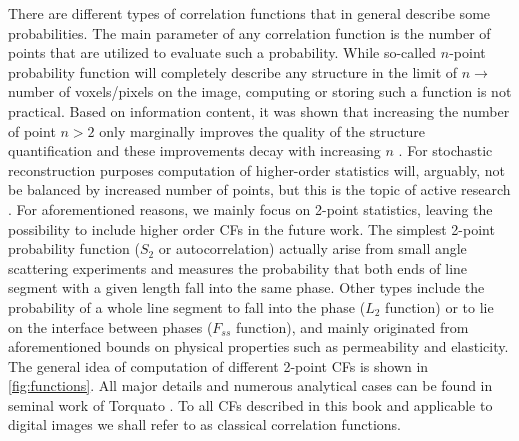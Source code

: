 \documentclass[1p]{elsarticle}
\begin{document}
There are different types of correlation functions that in general describe some
probabilities. The main parameter of any correlation function is the number of
points that are utilized to evaluate such a probability. While so-called
$n$-point probability function \cite{Torquato_book} will completely describe any
structure in the limit of $n \rightarrow$ number of voxels/pixels on the image,
computing or storing such a function is not practical. Based on information
content, it was shown that increasing the number of point $n > 2$ only
marginally improves the quality of the structure quantification and these
improvements decay with increasing $n$ \cite{yao1993high,Gommes2}. For
stochastic reconstruction purposes computation of higher-order statistics will,
arguably, not be balanced by increased number of points, but this is the topic
of active research \cite{skolnick2021,cherkasovIC}. For aforementioned reasons,
we mainly focus on 2-point statistics, leaving the possibility to include higher
order CFs in the future work. The simplest 2-point probability function ($S_2$
or autocorrelation) actually arise from small angle scattering experiments and
measures the probability that both ends of line segment with a given length fall
into the same phase. Other types include the probability of a whole line segment
to fall into the phase ($L_2$ function) or to lie on the interface between
phases ($F_{ss}$ function), and mainly originated from aforementioned bounds on
physical properties such as permeability and elasticity. The general idea of
computation of different 2-point CFs is shown in \cref{fig:functions}. All major
details and numerous analytical cases can be found in seminal work of Torquato
\cite{Torquato_book}. To all CFs described in this book and applicable to
digital images we shall refer to as classical correlation functions.
\end{document}
